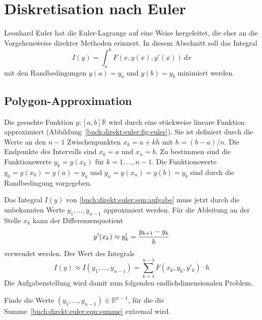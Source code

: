 %
%
%
\section{Diskretisation nach Euler
\label{buch:direkt:section:euler}}
Leonhard Euler
%
%
hat die Euler-Lagrange auf eine Weise hergeleitet, die eher an die 
Vorgehensweise direkter Methoden erinnert.
In diesem Abschnitt soll das Integral
\begin{equation}
I(y)
=
\int_a^b
F(x,y(x),y'(x))
\,dx
\label{buch:direkt:euler:eqn:aufgabe}
\end{equation}
mit den Randbedingungen $y(a)=y_a$ und $y(b)=y_b$ minimiert werden.

%
%
\subsection{Polygon-Approximation
\label{buch:direkt:euler:subsection:polygon}}

Die gesuchte Funktion $y\colon[a,b]\mathbb{R}$ wird durch eine stückweise
lineare Funktion approximiert (Abbildung~\ref{buch:direkt:euler:fig:euler}).
Sie ist definiert durch die Werte an den $n-1$ Zwischenpunkten
$x_k=a+kh$ mit $h=(b-a)/n$.
Die Endpunkte des Intervalls sind $x_0=a$ und $x_n=b$.
Zu bestimmen sind die Funktionswerte $y_k = y(x_k)$ für $k=1,\dots,n-1$.
Die Funktionswerte $y_0=y(x_0)=y(a)=y_a$ und $y_n=y(x_n)=y(b)=y_b$ 
sind durch die Randbedingung vorgegeben.

Das Integral $I(y)$ von \eqref{buch:direkt:euler:eqn:aufgabe} muss
jetzt durch die unbekannten Werte $y_1,\dots,y_{n-1}$ approximiert
werden.
Für die Ableitung an der Stelle $x_k$ kann der Differenzenquotient
\[
y'(x_k) 
\approx
y'_k
=
\frac{y_{k+1\mathstrut}-y_{k\mathstrut}}{h}
\]
verwendet werden.
Der Wert des Integrals 
\begin{equation}
I(y)
\approx
I(y_1,\dots,y_{n-1})
=
\sum_{k=1}^{n-1}
F(x_k, y_k, y'_k)\cdot h
\label{buch:direkt:euler:eqn:summe}
\end{equation}
Die Aufgabenstellung wird damit zum folgenden endlichdimensionalen
Problem.

\begin{aufgabe}
Finde die Werte $(y_1,\dots,y_{n-1})\in\mathbb{R}^{n-1}$, für die
die Summe~\eqref{buch:direkt:euler:eqn:summe} extremal wird.
\end{aufgabe}

